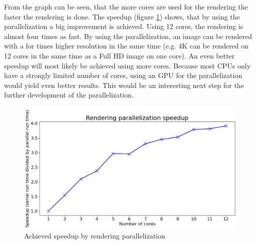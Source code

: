 \documentclass[12pt]{report}
\begin{document}
From the graph can be seen, that the more cores are used for the rendering the faster the rendering is done. The speedup (figure \ref{fig:speedup}) shows, that by using the parallelization a big improvement is achieved. Using 12 cores, the rendering is almost four times as fast. By using the parallelization, an image can be rendered with a for times higher resolution in the same time (e.g. 4K can be rendered on 12 cores in the same time as a Full HD image on one core). An even better speedup will most likely be achieved using more cores. Because most CPUs only have a strongly limited number of cores, using an GPU for the parallelization would yield even better results. This would be an interesting next step for the further development of the parallelization.
\begin{figure}[h!]
\includegraphics[width=\textwidth]{parallelization_speedup}
\centering
\caption{Achieved speedup by rendering parallelization}
\label{fig:speedup}
\end{figure}
\end{document}
